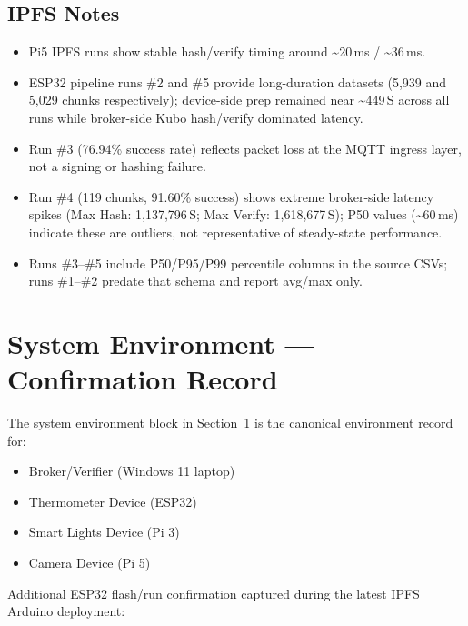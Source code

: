 \documentclass[11pt,letterpaper]{article}
\newcommand{\us}{\textmu{}S}   %
\begin{document}
\subsection{IPFS Notes}

\begin{itemize}[noitemsep]
    \item Pi5 IPFS runs show stable hash/verify timing around \textasciitilde{}20\,ms /
          \textasciitilde{}36\,ms.
    \item ESP32 pipeline runs \#2 and \#5 provide long-duration datasets (5,939 and 5,029
          chunks respectively); device-side prep remained near \textasciitilde{}449\,\us{}
          across all runs while broker-side Kubo hash/verify dominated latency.
    \item Run \#3 (76.94\% success rate) reflects packet loss at the MQTT ingress layer,
          not a signing or hashing failure.
    \item Run \#4 (119 chunks, 91.60\% success) shows extreme broker-side latency spikes
          (Max Hash: 1,137,796\,\us{}; Max Verify: 1,618,677\,\us{}); P50 values
          (\textasciitilde{}60\,ms) indicate these are outliers, not representative of
          steady-state performance.
    \item Runs \#3--\#5 include P50/P95/P99 percentile columns in the source CSVs;
          runs \#1--\#2 predate that schema and report avg/max only.
\end{itemize}

\section{System Environment --- Confirmation Record}

The system environment block in Section~1 is the canonical environment record for:

\begin{itemize}[noitemsep]
    \item Broker/Verifier (Windows 11 laptop)
    \item Thermometer Device (ESP32)
    \item Smart Lights Device (Pi 3)
    \item Camera Device (Pi 5)
\end{itemize}

Additional ESP32 flash/run confirmation captured during the latest IPFS Arduino deployment:
\end{document}
